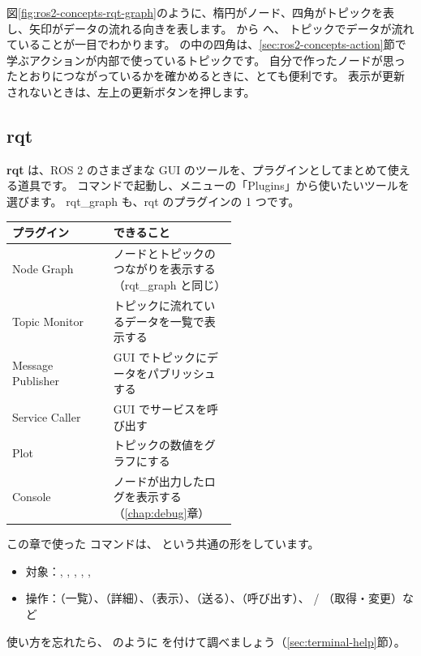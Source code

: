 図\ref{fig:ros2-concepts-rqt-graph}のように、楕円がノード、四角がトピックを表し、矢印がデータの流れる向きを表します。
 から  へ、 トピックでデータが流れていることが一目でわかります。
 の中の四角は、\ref{sec:ros2-concepts-action}節で学ぶアクションが内部で使っているトピックです。
自分で作ったノードが思ったとおりにつながっているかを確かめるときに、とても便利です。
表示が更新されないときは、左上の更新ボタンを押します。

\subsection{rqt}

\textbf{rqt} は、ROS 2 のさまざまな GUI のツールを、プラグインとしてまとめて使える道具です。
 コマンドで起動し、メニューの「Plugins」から使いたいツールを選びます。
rqt\_graph も、rqt のプラグインの 1 つです。

\begin{tablebox}
  \begin{tabular}{lp{0.55\linewidth}}
    \toprule
    プラグイン & できること \\
    \midrule
    Node Graph & ノードとトピックのつながりを表示する（rqt\_graph と同じ） \\
    Topic Monitor & トピックに流れているデータを一覧で表示する \\
    Message Publisher & GUI でトピックにデータをパブリッシュする \\
    Service Caller & GUI でサービスを呼び出す \\
    Plot & トピックの数値をグラフにする \\
    Console & ノードが出力したログを表示する（\ref{chap:debug}章） \\
    \bottomrule
  \end{tabular}
\end{tablebox}

\begin{point}
  この章で使った  コマンドは、 という共通の形をしています。
  \begin{itemize}
    \item 対象：, , , , , 
    \item 操作：（一覧）、（詳細）、（表示）、（送る）、（呼び出す）、 / （取得・変更）など
  \end{itemize}
  使い方を忘れたら、 のように  を付けて調べましょう（\ref{sec:terminal-help}節）。
\end{point}

